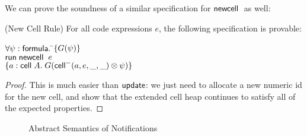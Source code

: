 We can prove the soundness of a similar specification for $\mathsf{newcell}\;$ as
well:

\begin{prop}{(New Cell Rule)}
For all code expressions $e$, the following specification is provable: 
\begin{tabbing}
$\forall \psi:\mathsf{formula}.\; $\=$\{{G(\psi)}\}$ \\
                           \>$\mathsf{run}\;{\mathsf{newcell}\;\;e}$ \\
                           \>$\{{a:\mathsf{cell}\;{A}.\; G(\mathsf{cell}^{-}({a}, {e}, {\_}, {\_}) \otimes \psi)}\}$
\end{tabbing}
\end{prop}

\begin{proof}
This is much easier than $\mathsf{update}$: we just need to allocate a new
numeric id for the new cell, and show that the extended cell heap
continues to satisfy all of the expected properties.
\end{proof}

\begin{figure}
\caption{Abstract Semantics of Notifications}
\label{abs-semantics}
\end{figure}

